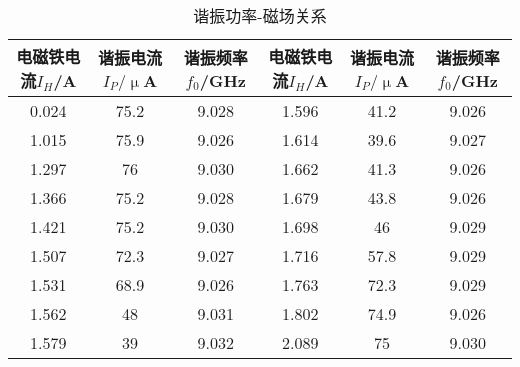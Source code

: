 \begin{table}[htbp!]
	\centering\small
	\caption{谐振功率-磁场关系}\label{tab:II}	\begin{tabular}{c||c|c|c|c|c}
		\hline\hline
		电磁铁电流$I_{H}$/A & 谐振电流$I_{P}/\upmu$A & 谐振频率$f_0$/GHz & 电磁铁电流$I_{H}$/A & 谐振电流$I_{P}/\upmu$A & 谐振频率$f_0$/GHz\\		\hline\hline
		0.024 & 75.2 & 9.028 & 1.596 & 41.2 & 9.026\\		\hline
		1.015 & 75.9 & 9.026 & 1.614 & 39.6 & 9.027\\		\hline
		1.297 & 76 & 9.030 & 1.662 & 41.3 & 9.026\\		\hline
		1.366 & 75.2 & 9.028 & 1.679 & 43.8 & 9.026\\		\hline
		1.421 & 75.2 & 9.030 & 1.698 & 46 & 9.029\\		\hline
		1.507 & 72.3 & 9.027 & 1.716 & 57.8 & 9.029\\		\hline
		1.531 & 68.9 & 9.026 & 1.763 & 72.3 & 9.029\\		\hline
		1.562 & 48 & 9.031 & 1.802 & 74.9 & 9.026\\		\hline
		1.579 & 39 & 9.032 & 2.089 & 75 & 9.030\\		\hline\hline
	\end{tabular}
\end{table}